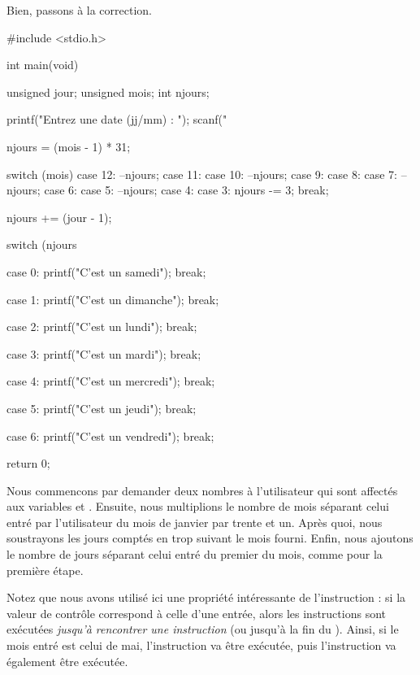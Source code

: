 Bien, passons à la correction.

\begin{C}
 #include <stdio.h>


int
main(void)
{
    unsigned jour;
    unsigned mois;
    int njours;

    printf("Entrez une date (jj/mm) : ");
    scanf("%

    njours = (mois - 1) * 31;

    switch (mois)
    {
    case 12:
        --njours;
    case 11:
    case 10:
        --njours;
    case 9:
    case 8:
    case 7:
        --njours;
    case 6:
    case 5:
        --njours;
    case 4:
    case 3:
        njours -= 3;
        break;
    }

    njours += (jour - 1);

    switch (njours %
    {
    case 0:
        printf("C'est un samedi\n");
        break;

    case 1:
        printf("C'est un dimanche\n");
        break;

    case 2:
        printf("C'est un lundi\n");
        break;

    case 3:
        printf("C'est un mardi\n");
        break;

    case 4:
        printf("C'est un mercredi\n");
        break;

    case 5:
        printf("C'est un jeudi\n");
        break;

    case 6:
        printf("C'est un vendredi\n");
        break;
    }

    return 0;
}
\end{C}

Nous commencons par demander deux nombres à l'utilisateur qui sont
affectés aux variables  et . Ensuite, nous
multiplions le nombre de mois séparant celui entré par l'utilisateur du
mois de janvier par trente et un. Après quoi, nous soustrayons les jours
comptés en trop suivant le mois fourni. Enfin, nous ajoutons le nombre
de jours séparant celui entré du premier du mois, comme pour la première
étape.

\begin{infobox}
Notez que nous avons utilisé ici une
propriété intéressante de l'instruction  : si la valeur
de contrôle correspond à celle d'une entrée, alors les instructions sont
exécutées \emph{jusqu'à rencontrer une instruction}  (ou
jusqu'à la fin du ). Ainsi, si le mois entré est celui de
mai, l'instruction  va être exécutée, puis
l'instruction  va également être exécutée. 
\end{infobox}

